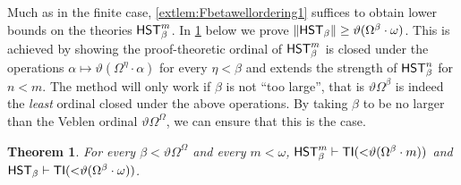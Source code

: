 \documentclass[UKenglish,cleveref,DIV=12]{scrartcl}
\newtheorem{theorem}{Theorem}
\theoremstyle{definition}
\theoremstyle{definition}
\begin{document}
Much as in the finite case, \cref{extlem:Fbetawellordering1} suffices to obtain
lower bounds on the theories $\mathsf{HST}_\beta^m$. In \cref{extthm:Fbetalowerbound}
below we prove $\lVert{\mathsf{HST}_\beta}\rVert\ge\vartheta(\Omega^\beta\cdot\omega)$. This is
achieved by showing the proof-theoretic ordinal of $\mathsf{HST}_\beta^m$ is closed under
the operations $\alpha\mapsto\vartheta(\Omega^\eta\cdot\alpha)$ for every
$\eta<\beta$ and extends the strength of $\mathsf{HST}_\beta^n$ for $n<m$. The method will
only work if $\beta$ is not ``too large'', that is $\vartheta\Omega^\beta$ is
indeed the {\em least} ordinal closed under the above operations. By taking
$\beta$ to be no larger than the Veblen ordinal $\vartheta\Omega^\Omega$,
we can ensure that this is the case. %
\begin{theorem}\label{extthm:Fbetalowerbound}
  For every $\beta<\vartheta\Omega^\Omega$ and every $m<\omega$,
  $\mathsf{HST}_\beta^{m}\vdash\mathsf{TI}(\mathord<\vartheta(\Omega^\beta\cdot m))$ and $\mathsf{HST}_\beta\vdash\mathsf{TI}(\mathord<\vartheta(\Omega^\beta\cdot\omega))$.
\end{theorem}
\end{document}
